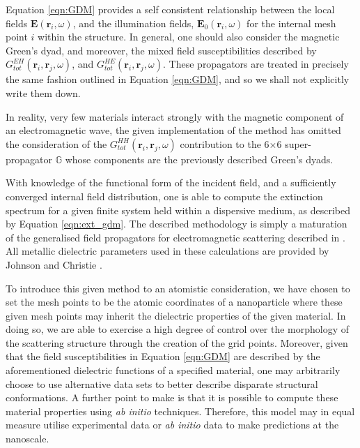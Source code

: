 Equation \ref{eqn:GDM} provides a self consistent relationship between the local fields $\textbf{E} \left( \textbf{r}_{i}, \omega \right)$, and the illumination fields, $\textbf{E}_{0} \left( \textbf{r}_{i}, \omega \right)$ for the internal mesh point $i$ within the structure. In general, one should also consider the magnetic Green's dyad, and moreover, the mixed field susceptibilities described by $G_{tot}^{EH} \left( \textbf{r}_{i},\textbf{r}_{j}, \omega \right)$, and $G_{tot}^{HE} \left( \textbf{r}_{i},\textbf{r}_{j}, \omega \right)$. These propagators are treated in precisely the same fashion outlined in Equation \ref{eqn:GDM}, and so we shall not explicitly write them down.

In reality, very few materials interact strongly with the magnetic component of an electromagnetic wave, the given implementation of the method has omitted the consideration of the $G_{tot}^{HH} \left( \textbf{r}_{i},\textbf{r}_{j}, \omega \right)$ contribution to the 6$\times$6 super-propagator $\mathbb{G}$ whose components are the previously described Green's dyads.

With knowledge of the functional form of the incident field, and a sufficiently converged internal field distribution, one is able to compute the extinction spectrum for a given finite system held within a dispersive medium, as described by Equation \ref{eqn:ext_gdm}. The described methodology is simply a maturation of the generalised field propagators for electromagnetic scattering described in \cite{PhysRevLett.74.526}. All metallic dielectric parameters used in these calculations are provided by Johnson and Christie \cite{PhysRevB.6.4370}.

To introduce this given method to an atomistic consideration, we have chosen to set the mesh points to be the atomic coordinates of a nanoparticle where these given mesh points may inherit the dielectric properties of the given material. In doing so, we are able to exercise a high degree of control over the morphology of the scattering structure through the creation of the grid points. Moreover, given that the field susceptibilities in Equation \ref{eqn:GDM} are described by the aforementioned dielectric functions of a specified material, one may arbitrarily choose to use alternative data sets to better describe disparate structural conformations. A further point to make is that it is possible to compute these material properties using \textit{ab initio} techniques. Therefore, this model may in equal measure utilise experimental data or \textit{ab initio} data to make predictions at the nanoscale.

